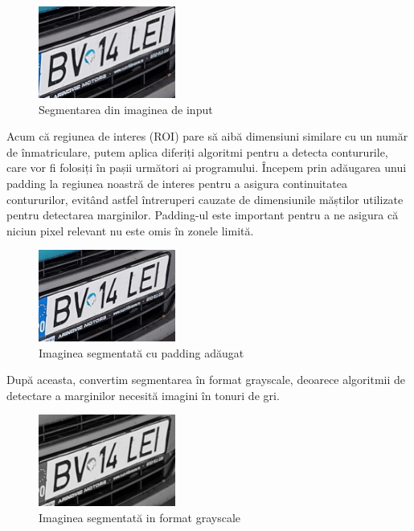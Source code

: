 \documentclass[a4paper,12pt]{report}
\begin{document}
\begin{figure}[h!]
    \centering
    \includegraphics[width=0.4\textwidth]{images/color_roi.jpg}
    \caption{Segmentarea din imaginea de input}
\end{figure}
\FloatBarrier

Acum că regiunea de interes (ROI) pare să aibă dimensiuni similare cu un număr de înmatriculare, putem aplica diferiți algoritmi pentru a detecta contururile, care vor fi folosiți în pașii următori ai programului. Începem prin adăugarea unui padding la regiunea noastră de interes pentru a asigura continuitatea contururilor, evitând astfel întreruperi cauzate de dimensiunile măștilor utilizate pentru detectarea marginilor. Padding-ul este important pentru a ne asigura că niciun pixel relevant nu este omis în zonele limită.

\begin{figure}[h!]
    \centering
    \includegraphics[width=0.4\textwidth]{images/padded_roi.jpg}
    \caption{Imaginea segmentată cu padding adăugat}
\end{figure}
\FloatBarrier

După aceasta, convertim segmentarea în format grayscale, deoarece algoritmii de detectare a marginilor necesită imagini în tonuri de gri.

\begin{figure}[h!]
    \centering
    \includegraphics[width=0.4\textwidth]{images/gray_roi.jpg}
    \caption{Imaginea segmentată in format grayscale}
\end{figure}
\FloatBarrier
\end{document}
